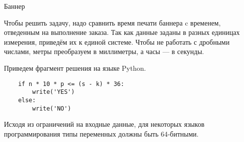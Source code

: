 \begin{tutorial}{Баннер}

Чтобы решить задачу, надо сравнить время печати баннера c временем, отведенным на выполнение заказа. Так как данные заданы в разных единицах измерения, приведём их к единой системе. Чтобы не работать с дробными числами, метры преобразуем в миллиметры, а часы --- в секунды.

Приведем фрагмент решения на языке Python.
\begin{verbatim}
    if n * 10 * p <= (s - k) * 36:
        write('YES')
    else:
        write('NO')
\end{verbatim}

Исходя из ограничений на входные данные, для некоторых языков программирования типы переменных должны быть 64-битными. 


\end{tutorial}
